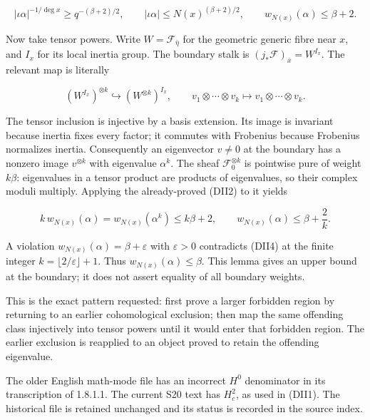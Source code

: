 \[|\iota\alpha|^{-1/\deg x}\ge q^{-(\beta+2)/2},\qquad
|\iota\alpha|\le N(x)^{(\beta+2)/2},\qquad
w_{N(x)}(\alpha)\le\beta+2.\tag{DII2}\]

Now take tensor powers. Write \(W=\mathcal F_{\bar\eta}\) for the
geometric generic fibre near \(x\), and \(I_x\) for its local inertia
group. The boundary stalk is \((j_*\mathcal F)_{\bar x}=W^{I_x}\). The
relevant map is literally

\[(W^{I_x})^{\otimes k}\hookrightarrow(W^{\otimes k})^{I_x},
\qquad v_1\otimes\cdots\otimes v_k\longmapsto v_1\otimes\cdots\otimes v_k.\tag{DII3}\]

The tensor inclusion is injective by a basis extension. Its image is
invariant because inertia fixes every factor; it commutes with Frobenius
because Frobenius normalizes inertia. Consequently an eigenvector
\(v\ne0\) at the boundary has a nonzero image \(v^{\otimes k}\) with
eigenvalue \(\alpha^k\). The sheaf \(\mathcal F_0^{\otimes k}\) is
pointwise pure of weight \(k\beta\): eigenvalues in a tensor product are
products of eigenvalues, so their complex moduli multiply. Applying the
already-proved (DII2) to it yields

\[k\,w_{N(x)}(\alpha)=w_{N(x)}(\alpha^k)\le k\beta+2,
\qquad w_{N(x)}(\alpha)\le\beta+\frac2k.\tag{DII4}\]

A violation \(w_{N(x)}(\alpha)=\beta+\varepsilon\) with
\(\varepsilon>0\) contradicts (DII4) at the finite integer
\(k=\lfloor2/\varepsilon\rfloor+1\). Thus \(w_{N(x)}(\alpha)\le\beta\).
This lemma gives an upper bound at the boundary; it does not assert
equality of all boundary weights.

This is the exact pattern requested: first prove a larger forbidden
region by returning to an earlier cohomological exclusion; then map the
same offending class injectively into tensor powers until it would enter
that forbidden region. The earlier exclusion is reapplied to an object
proved to retain the offending eigenvalue.

The older English math-mode file has an incorrect \(H^0\) denominator in
its transcription of 1.8.1.1. The current S20 text has \(H_c^2\), as
used in (DII1). The historical file is retained unchanged and its status
is recorded in the source index.
